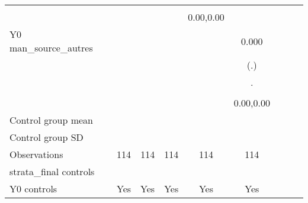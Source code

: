 \begin{table}[!h]
\begin{adjustbox}{width=\columnwidth,center}
\begin{tabular}{l*{8}{c}}
                    &                     &                     &                     &                     &                     \\
                    &                     &                     &                     &   0.00,0.00         &                     \\
Y0 man\_source\_autres&                     &                     &                     &                     &       0.000         \\
                    &                     &                     &                     &                     &         (.)         \\
                    &                     &                     &                     &                     &           .         \\
                    &                     &                     &                     &                     &                     \\
                    &                     &                     &                     &                     &   0.00,0.00         \\
\hline
Control group mean  &                     &                     &                     &                     &                     \\
Control group SD    &                     &                     &                     &                     &                     \\
Observations        &         114         &         114         &         114         &         114         &         114         \\
strata\_final controls&                     &                     &                     &                     &                     \\
Y0 controls         &         Yes         &         Yes         &         Yes         &         Yes         &         Yes         \\

\end{tabular}
\end{adjustbox}
\end{table}
